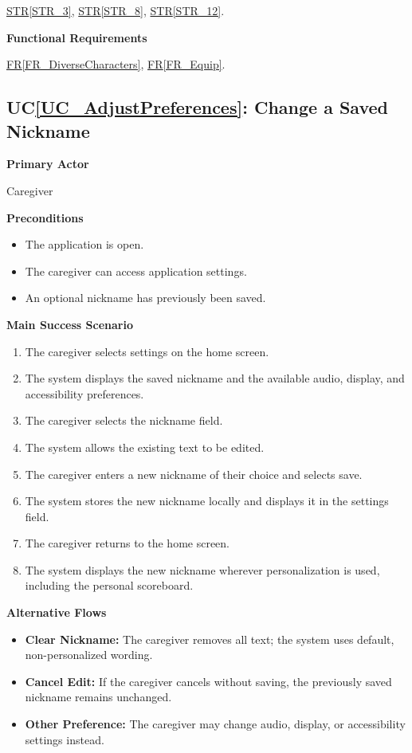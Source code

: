 \documentclass[10pt]{article}
\newcommand{\strref}[1]{\hyperref[#1]{STR\ref*{#1}}}
\newcounter{ucnum} %
\newcommand{\ucheading}[1]{UC\ref*{#1}}
\newcommand{\rref}[1]{\hyperref[#1]{FR\ref*{#1}}}
\begin{document}
\strref{STR_3}, \strref{STR_8}, \strref{STR_12}.

\textbf{Functional Requirements}

\rref{FR_DiverseCharacters}, \rref{FR_Equip}.

\label{UC_AdjustPreferences}
\subsection{\ucheading{UC_AdjustPreferences}: Change a Saved Nickname}

\textbf{Primary Actor}

Caregiver

\textbf{Preconditions}
\begin{itemize}
    \item The application is open.
    \item The caregiver can access application settings.
    \item An optional nickname has previously been saved.
\end{itemize}

\textbf{Main Success Scenario}
\begin{enumerate}
    \item The caregiver selects settings on the home screen.
    \item The system displays the saved nickname and the
    available audio, display, and accessibility preferences.
    \item The caregiver selects the nickname field.
    \item The system allows the existing text to be edited.
    \item The caregiver enters a new nickname of their choice
    and selects save.
    \item The system stores the new nickname locally and
    displays it in the settings field.
    \item The caregiver returns to the home screen.
    \item The system displays the new nickname wherever
    personalization is used, including the personal scoreboard.
\end{enumerate}

\textbf{Alternative Flows}
\begin{itemize}
    \item \textbf{Clear Nickname:} The caregiver removes all text;
    the system uses default, non-personalized wording.
    \item \textbf{Cancel Edit:} If the caregiver cancels without saving,
    the previously saved nickname remains unchanged.
    \item \textbf{Other Preference:} The caregiver may change
    audio, display, or accessibility settings instead.
\end{itemize}
\end{document}
